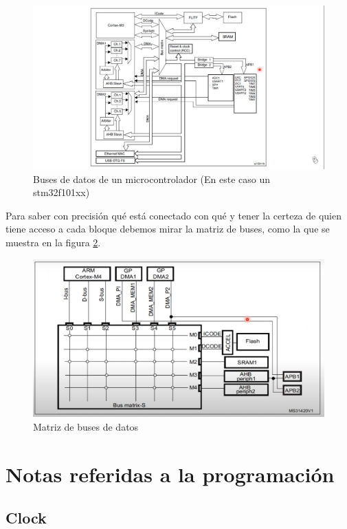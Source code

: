 \documentclass[a4paper,12pt]{report} %
\begin{document}
\begin{figure}[H]
	\centering
	\includegraphics[scale=0.3]{Imagenes/stm/bus}
	\caption{Buses de datos de un microcontrolador (En este caso un stm32f101xx)}
	\label{bus1}
\end{figure}

Para saber con precisión qué está conectado con qué y tener la certeza de quien tiene acceso a cada bloque debemos mirar la matriz de buses, como la que se muestra en la figura \ref{bus2}.

\begin{figure}[H]
	\centering
	\includegraphics[scale=0.5]{Imagenes/stm/busmatrix}
	\caption{Matriz de buses de datos}
	\label{bus2}
\end{figure}

\chapter{Notas referidas a la programación}

\section{Clock}
\end{document}
